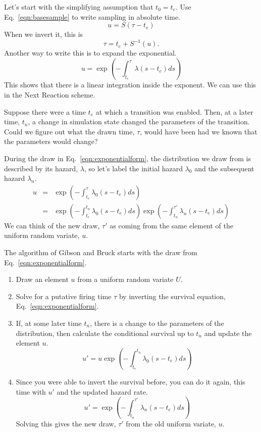 \documentclass{article}
\begin{document}
Let's start with the simplifying assumption that $t_0=t_e$. Use Eq.~\ref{eqn:basesample} to write sampling in absolute time.
\begin{equation}
	u = S(\tau - t_e)
\end{equation}
When we invert it, this is
\begin{equation}
	\tau = t_e + S^{-1}(u).
\end{equation}
Another way to write this is to expand the exponential.
\begin{equation}
u=\exp\left(-\int_{t_e}^{\tau}\lambda(s-t_e)ds\right)\label{eqn:exponentialform}
\end{equation}
This shows that there is a linear integration inside the exponent. We can use this in the Next Reaction scheme.

Suppose there were a time $t_e$ at which a transition was enabled. Then, at a later time, $t_n$, a change in simulation state changed the parameters of the transition. Could we figure out what the drawn time, $\tau$, would have been had we known that the parameters would change?

During the draw in Eq.~\ref{eqn:exponentialform}, the distribution we draw from is described by its hazard, $\lambda$, so let's label the initial hazard $\lambda_0$ and the subsequent hazard $\lambda_n$.
\begin{eqnarray}
	u&=&\exp\left(-\int_{t_e}^{\tau}\lambda_0(s-t_e)ds\right) \\
	&=& \exp\left(-\int_{t_e}^{t_n}\lambda_0(s-t_e)ds\right)\exp\left(-\int_{t_n}^{\tau'}\lambda_{n}(s-t_e)ds\right)\label{eqn:expequivalence}
\end{eqnarray}
We can think of the new draw, $\tau'$ as coming from the same element of the uniform random variate, $u$.

The algorithm of Gibson and Bruck starts with the draw from Eq.~\ref{eqn:exponentialform}.
\begin{enumerate}
	\item Draw an element $u$ from a uniform random variate $U$.

	\item Solve for a putative firing time $\tau$ by inverting the survival equation, Eq.~\ref{eqn:exponentialform}.

	\item If, at some later time $t_n$, there is a change to the parameters of the distribution, then calculate the conditional survival up to $t_n$ and update the element $u$.
	\begin{equation}
		u'=u\exp\left(-\int_{t_e}^{t_n}\lambda_0(s-t_e)ds\right)
	\end{equation}

	\item Since you were able to invert the survival before, you can do it again, this time with $u'$ and the updated hazard rate.
	\begin{equation}
		u'=\exp\left(-\int_{t_n}^{\tau'}\lambda_{n}(s-t_e)ds\right)
	\end{equation}
	Solving this gives the new draw, $\tau'$ from the old uniform variate, $u$.
\end{enumerate}
\end{document}
